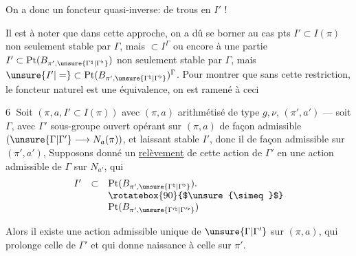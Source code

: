 
On a donc un foncteur quasi-inverse:
 de trous en $I'$ !


Il est à noter que dans cette approche, on a dû se borner au cas
  pts 
$I'\subset I(\pi)$ non seulement stable par $\Gamma$, mais
 $\subset I^\Gamma$
 ou encore à une partie
$I'\subset\mathrm{Pt}(B_{\pi',\unsure{\Gamma^{\natural}|\Gamma^{\flat}}})$
non seulement stable par $\Gamma$, mais
$\unsure{I'|=}\subset\mathrm{Pt}(B_{\pi',\unsure{\Gamma^{\natural}|\Gamma^{\flat}}})^\Gamma$.
Pour montrer que sans cette restriction, le foncteur naturel
  est 
une équivalence, on est ramené à ceci

\textcircled{6} Soit $(\pi,a,I'\subset I(\pi))$ avec $(\pi,a)$
   arithmétisé de type
$g,\nu$,  $(\pi',a')$ --- soit $\Gamma$, avec $\Gamma'$
sous-groupe ouvert opérant sur $(\pi,a)$ de façon admissible
$(\unsure{\Gamma|\Gamma'}\longrightarrow N_a(\pi))$,
et laissant stable $I'$, donc il  de façon admissible sur
$(\pi',a')$,
Supposons donné un \uline{relèvement} de cette action de $\Gamma'$
en une action admissible de $\Gamma$ sur $N_{a'}$, qui 
\[
\begin{array}{rcl}
I'&\subset&\mathrm{Pt}(B_{\pi',\unsure{\Gamma^{\natural}|\Gamma^{\flat}}}).\\
&&\rotatebox{90}{$\unsure{\simeq}$}\\
&&\mathrm{Pt}(B_{\pi',\unsure{\Gamma^{\prime\natural}|\Gamma^{\prime\flat}}})
\end{array}
\]


Alors il existe une action admissible unique de $\unsure{\Gamma|\Gamma'}$
sur $(\pi,a)$, qui prolonge celle de $\Gamma'$ et qui donne naissance
à celle  sur $\pi'$.
